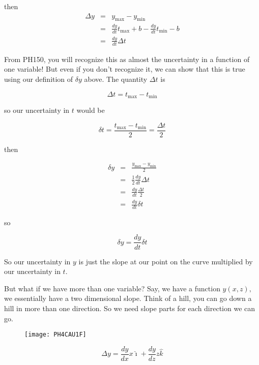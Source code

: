 then 
\begin{eqnarray*}
	\Delta y &=&y_{\max }-y_{\min } \\
			 &=&\frac{dy}{dt}t_{\max }+b-\frac{dy}{dt}t_{\min }-b \\
             &=&\frac{dy}{dt}\Delta t
\end{eqnarray*}

From PH150, you will recognize this as almost the uncertainty in a function of one variable! But even if you don't recognize it, we can show that this is true using our definition of $\delta y$ above. The quantity $\Delta t$ is 

\begin{equation*}
	\Delta t=t_{\max }-t_{\min }
\end{equation*}

so our uncertainty in $t$ would be 

\begin{equation*}
	\delta t=\frac{t_{\max }-t_{\min }}{2}=\frac{\Delta t}{2}
\end{equation*}

then 

\begin{eqnarray*}
	\delta y &=&\frac{y_{\max }-y_{\min }}{2} \\
             &=&\frac{1}{2}\frac{dy}{dt}\Delta t \\
             &=&\frac{dy}{dt}\frac{\Delta t}{2} \\
             &=&\frac{dy}{dt}\delta t
\end{eqnarray*}

so

\begin{equation*}
   \delta y=\frac{dy}{dt}\delta t
\end{equation*}

So our uncertainty in $y$ is just the slope at our point on the curve multiplied by our uncertainty in $t.$

But what if we have more than one variable? Say, we have a function $y(x,z),$ we essentially have a two dimensional slope. Think of a hill, you can go down a hill in more than one direction. So we need slope parts for each direction we can go.

\begin{figure}[h!]
	\centering
    \texttt{[image: PH4CAU1F]}
\end{figure}

\begin{equation*}
   \Delta y=\frac{dy}{dx}x\hat{\imath}+\frac{dy}{dz}z\hat{k}
\end{equation*}

